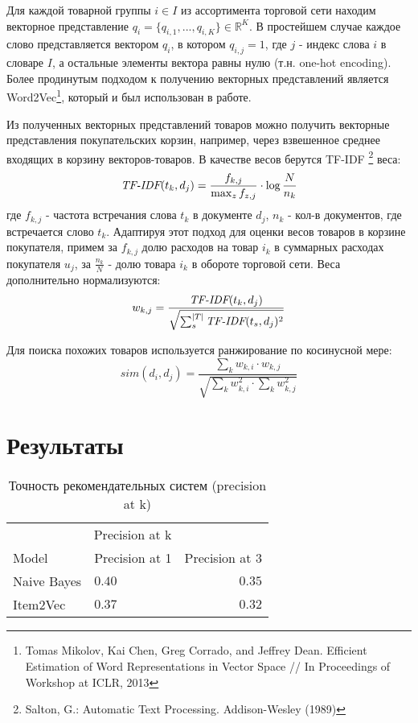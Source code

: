 \documentclass{article}
\begin{document}
Для каждой товарной группы $i \in I$ из ассортимента торговой сети находим векторное представление $q_i = \{q_{i,1}, ..., q_{i,K}\} \in \mathbb{R}^{K}$. В простейшем случае каждое слово представляется вектором $q_i$, в котором $q_{i, j} = 1$, где $j$ - индекс слова $i$ в словаре $I$, а остальные элементы вектора равны нулю (т.н. one-hot encoding). Более продинутым подходом к получению векторных представлений является Word2Vec\footnote{Tomas Mikolov, Kai Chen, Greg Corrado, and Jeffrey Dean. Efficient Estimation of Word Representations in Vector Space // In Proceedings of Workshop at ICLR, 2013}, который и был использован в работе.  \par
Из полученных векторных представлений товаров можно получить векторные представления покупательских корзин, например, через взвешенное среднее входящих в корзину векторов-товаров. В качестве весов берутся TF-IDF \footnote{Salton, G.: Automatic Text Processing. Addison-Wesley (1989)} веса:
\begin{equation}
\textit{TF-IDF} (t_k, d_j) = \frac{f_{k, j}}{\max_z f_{z,j} } \cdot \log \frac{N}{n_k}
\end{equation}
где $f_{k,j}$ - частота встречания слова $t_k$ в документе $d_j$, $n_k$ - кол-в документов, где встречается слово $t_k$. Адаптируя этот подход для оценки весов товаров в корзине покупателя, примем за $f_{k,j}$ долю расходов на товар $i_k$ в суммарных расходах покупателя $u_j$, за $\frac{n_k}{N}$ - долю товара $i_k$ в обороте торговой сети. Веса дополнительно нормализуются:
\begin{equation}
w_{k,j} = \frac{\textit{TF-IDF} (t_k, d_j)}{\sqrt{\sum_s^{|T|}\textit{TF-IDF} (t_s, d_j)^2}}
\end{equation}

Для поиска похожих товаров используется ранжирование по косинусной мере:
\begin{equation}
sim(d_i, d_j) = \frac{\sum_k w_{k, i} \cdot w_{k, j}}{ \sqrt{\sum_k w_{k, i}^2 \cdot \sum_k w_{k, j}^2}}
\end{equation}


\section{Результаты}

\begin{table}
\caption{Точность рекомендательных систем (precision at k)}
\centering
\begin{tabular}{llr}
\toprule
\multicolumn{2}{r}{Precision at k} \\
\cmidrule(r){1-3}
Model & Precision at 1 & Precision at 3 \\
\midrule
Naive Bayes & $0.40$ & $0.35$ \\
Item2Vec & $0.37$ & $0.32$ \\
\bottomrule
\end{tabular}
\end{table}
\end{document}
